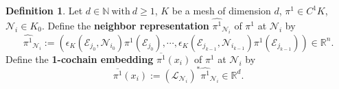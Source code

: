 \documentclass[fleqn]{article}
\theoremstyle{definition}
\newtheorem{definition}[theorem]{Definition}
\begin{document}
\begin{definition}
  Let $d \in \mathbb{N}\ \text{with}\ d \geq 1$, $K$ be a mesh of dimension $d$,
  $\pi^1 \in C^1 K$, $\mathcal{N}_i \in K_0$.
  Define the \textbf{neighbor representation} $\widehat{\pi^1}_{\mathcal{N}_i}$
  of $\pi^1$ at $\mathcal{N}_i$ by
  \begin{equation}
    \widehat{\pi^1}_{\mathcal{N}_i} :=
    ( \epsilon_K(\mathcal{E}_{j_0}, \mathcal{N}_{i_0}) \pi^1(\mathcal{E}_{j_0}),
      \cdots,
        \epsilon_K(\mathcal{E}_{j_{k - 1}}, \mathcal{N}_{i_{k - 1}})
        \pi^1(\mathcal{E}_{j_{k - 1}})
    ) \in \mathbb{R}^n.
  \end{equation}
  Define the \textbf{1-cochain embedding} $\overline{\pi^1}(x_i)$
  of $\pi^1$ at $\mathcal{N}_i$ by
  \begin{equation}
    \overline{\pi^1}(x_i) :=
    \left(\mathcal{L}_{\mathcal{N}_i}\right)^* \widehat{\pi^1}_{\mathcal{N}_i}
    \in \mathbb{R}^d.
  \end{equation}
\end{definition}
\end{document}
